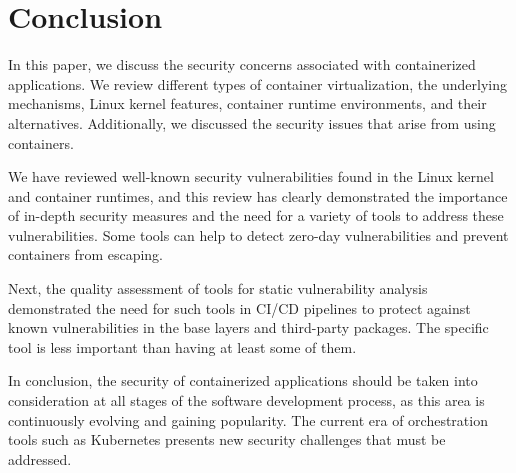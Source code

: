 \section{Conclusion}

In this paper, we discuss the security concerns associated with containerized applications. We review different types of container virtualization, the underlying mechanisms, Linux kernel features, container runtime environments, and their alternatives. Additionally, we discussed the security issues that arise from using containers.


We have reviewed well-known security vulnerabilities found in the Linux kernel and container runtimes, and this review has clearly demonstrated the importance of in-depth security measures and the need for a variety of tools to address these vulnerabilities. Some tools can help to detect zero-day vulnerabilities and prevent containers from escaping.

Next, the quality assessment of tools for static vulnerability analysis demonstrated the need for such tools in CI/CD pipelines to protect against known vulnerabilities in the base layers and third-party packages. The specific tool is less important than having at least some of them.

In conclusion, the security of containerized applications should be taken into consideration at all stages of the software development process, as this area is continuously evolving and gaining popularity. The current era of orchestration tools such as Kubernetes presents new security challenges that must be addressed.
